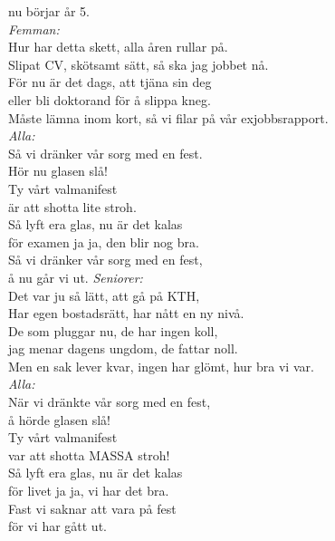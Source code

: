 \documentclass[a6paper, 10pt, twoside]{article}
\begin{document}
\begin{lyrics}
nu börjar år 5.
\vspace{5pt} \\
\textit{Femman:} \\
Hur har detta skett, alla åren rullar på. \\
Slipat CV, skötsamt sätt, så ska jag jobbet nå. \\
För nu är det dags, att tjäna sin deg \\
eller bli doktorand för å slippa kneg. \\
Måste lämna inom kort, \physicalonly{\\}så vi filar på vår exjobbsrapport.
\vspace{5pt} \\
\textit{Alla:} \\
Så vi dränker vår sorg med en fest. \\
Hör nu glasen slå! \\
Ty vårt valmanifest \\
är att shotta lite stroh. \\
Så lyft era glas, nu är det kalas \\
för examen ja ja, den blir nog bra. \\
Så vi dränker vår sorg med en fest, \\
å nu går vi ut.
\newpage
\noindent
\textit{Seniorer:} \\
Det var ju så lätt, att gå på KTH, \\
Har egen bostadsrätt, har nått en ny nivå. \\
De som pluggar nu, de har ingen koll, \\
jag menar dagens ungdom, de fattar noll. \\
Men en sak lever kvar, \physicalonly{\\}ingen har glömt, hur bra vi var.
\vspace{5pt} \\
\textit{Alla:} \\
När vi dränkte vår sorg med en fest, \\
å hörde glasen slå! \\
Ty vårt valmanifest \\
var att shotta MASSA stroh! \\
Så lyft era glas, nu är det kalas \\
för livet ja ja, vi har det bra. \\
Fast vi saknar att vara på fest \\
för vi har gått ut.
\end{lyrics}
\end{document}
